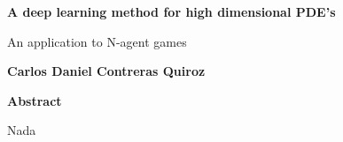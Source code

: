 

\fancyhf{} %
\fancyhead[RO,R]{\thepage} %
\renewcommand{\headrulewidth}{0pt}

\begin{center}
    \Large
    \textbf{A deep learning method for high dimensional PDE's}
    
    \vspace{0.4cm}
    \large
    An application to N-agent games
    
    \vspace{0.4cm}
    \textbf{Carlos Daniel Contreras Quiroz}
    
    \vspace{0.9cm}
    \textbf{Abstract}
\end{center}
Nada